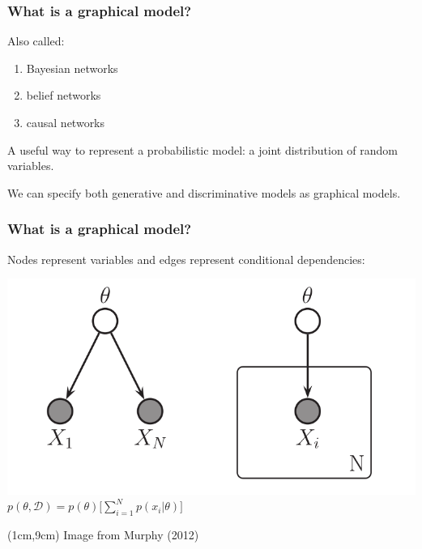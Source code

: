 \documentclass[mathserif]{beamer}
\begin{document}
\begin{frame}

    \frametitle{What is a graphical model?}
    \small
    \begin{block}{Also called:}
    \begin{enumerate}
        \item Bayesian networks
        \item belief networks
        \item causal networks
    \end{enumerate}
    \end{block}
    \begin{block}{A useful way to represent a probabilistic model: a joint distribution of random variables.}
    \end{block}
    We can specify both generative and discriminative models as graphical models. 
\end{frame}


\begin{frame}

    \frametitle{What is a graphical model?}
    \small
    \begin{block}{Nodes represent variables and edges represent conditional dependencies:}
    \begin{center}
    \includegraphics[scale=0.3]{figures/graphical_model.png}\\
        \medskip
        $p(\theta,\mathcal{D}) = p(\theta) \Big[ \displaystyle\sum^N_{i=1} p(x_i|\theta) \Big]$
    \end{center}
    \end{block}
    \begin{textblock*}{10cm}(1cm,9cm)
    \tiny Image from Murphy (2012)
    \end{textblock*}
\end{frame}
\end{document}
